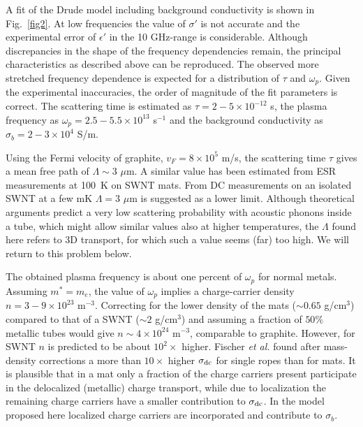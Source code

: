 \begin{multicols}{2}
A fit of the Drude model including background conductivity is shown
in Fig.~\ref{fig2}. At low frequencies the value of $\sigma'$ is
not accurate and the experimental error of $\epsilon'$ in the 10
GHz-range is considerable. Although discrepancies in the shape of
the frequency dependencies remain, the principal characteristics as
described above can be reproduced. The observed more stretched
frequency dependence is expected for a distribution of $\tau$ and
$\omega_p$. Given the experimental inaccuracies, the order of magnitude of
the fit parameters is correct.  The scattering time is estimated as $\tau = 2
- 5\times10^{-12}$ s, the plasma frequency as $\omega_p = 2.5 -
5.5\times10^{13}$ s$^{-1}$ and the background conductivity as
$\sigma_b = 2-3\times10^4$ S/m.

Using the Fermi velocity of graphite, $v_F = 8 \times 10^5$ m/s, the
scattering time $\tau$ gives a mean free path of $\Lambda \sim 3$ $\mu$m. A
similar value has been estimated from ESR measurements at 100~K on SWNT
mats\cite{Petit97}. From DC measurements on an isolated SWNT at a few mK
$\Lambda = 3$ $\mu$m is suggested as a lower limit\cite{Tans97}.  Although
theoretical arguments\cite{Farajian99} predict
a very low scattering probability with acoustic phonons inside a tube, which
might allow similar values also at higher temperatures, the $\Lambda$ found
here refers to 3D transport, for which such a value seems (far) too high. We
will return to this problem below.

The obtained plasma frequency is about one percent of $\omega_p$ for normal
metals. Assuming $m^* = m_e$, the value of $\omega_p$
implies a charge-carrier density $n = 3 - 9 \times 10^{23}$
m$^{-3}$. Correcting for the lower density of the mats ($\sim 0.65$
g/cm$^3$) compared to that of a SWNT ($\sim 2$ g/cm$^3$) and
assuming a fraction of $50\%$ metallic tubes\cite{Petit97} would
give $n \sim 4 \times 10^{24}$ m$^{-3}$, comparable to graphite.
However, for SWNT $n$ is predicted to be about $10^2 \times$
higher\cite{Mintmire92}. Fischer {\sl et al.}\cite{Fischer97} found after
mass-density corrections a more than $10 \times$ higher
$\sigma_{\rm dc}$ for single ropes than for mats. It is
plausible that in a mat only a fraction of the charge carriers
present participate in the delocalized (metallic) charge transport, while due
to localization the remaining charge carriers have a
smaller contribution to $\sigma_{\rm dc}$\cite{Bezryadin98}. In the model
proposed here localized charge carriers are incorporated and contribute to
$\sigma_b$.


\end{multicols}
